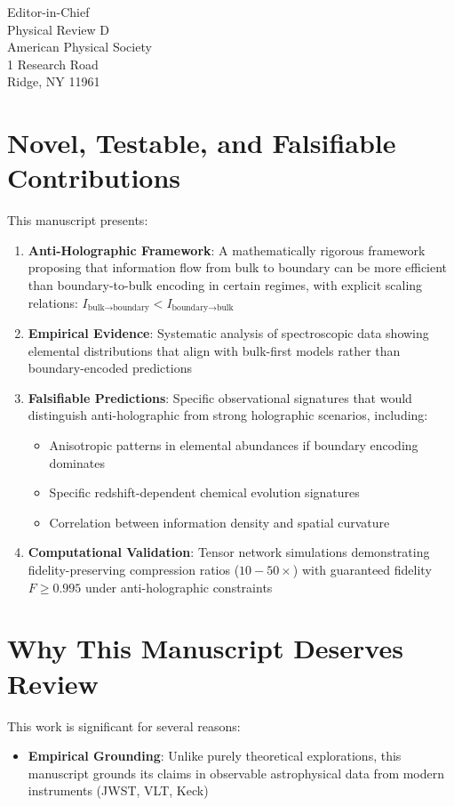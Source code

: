 \documentclass[11pt]{letter}
\begin{document}
\begin{letter}{Editor-in-Chief\\Physical Review D\\American Physical Society\\1 Research Road\\Ridge, NY 11961}
\section*{Novel, Testable, and Falsifiable Contributions}

This manuscript presents:

\begin{enumerate}
    \item \textbf{Anti-Holographic Framework}: A mathematically rigorous framework proposing that information flow from bulk to boundary can be more efficient than boundary-to-bulk encoding in certain regimes, with explicit scaling relations: $I_{\text{bulk}\to\text{boundary}} < I_{\text{boundary}\to\text{bulk}}$
    
    \item \textbf{Empirical Evidence}: Systematic analysis of spectroscopic data showing elemental distributions that align with bulk-first models rather than boundary-encoded predictions
    
    \item \textbf{Falsifiable Predictions}: Specific observational signatures that would distinguish anti-holographic from strong holographic scenarios, including:
    \begin{itemize}
        \item Anisotropic patterns in elemental abundances if boundary encoding dominates
        \item Specific redshift-dependent chemical evolution signatures
        \item Correlation between information density and spatial curvature
    \end{itemize}
    
    \item \textbf{Computational Validation}: Tensor network simulations demonstrating fidelity-preserving compression ratios ($10-50\times$) with guaranteed fidelity $F \geq 0.995$ under anti-holographic constraints
\end{enumerate}

\section*{Why This Manuscript Deserves Review}

This work is significant for several reasons:

\begin{itemize}
    \item \textbf{Empirical Grounding}: Unlike purely theoretical explorations, this manuscript grounds its claims in observable astrophysical data from modern instruments (JWST, VLT, Keck)
    

\end{itemize}
\end{letter}
\end{document}
